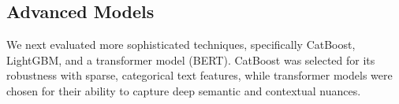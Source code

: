 \subsection{Advanced Models}  %
We next evaluated more sophisticated techniques, specifically
CatBoost, LightGBM, and a transformer model (BERT).
CatBoost was selected for its robustness with sparse, categorical text features,
while transformer models were chosen for their ability to capture deep semantic
and contextual nuances.
